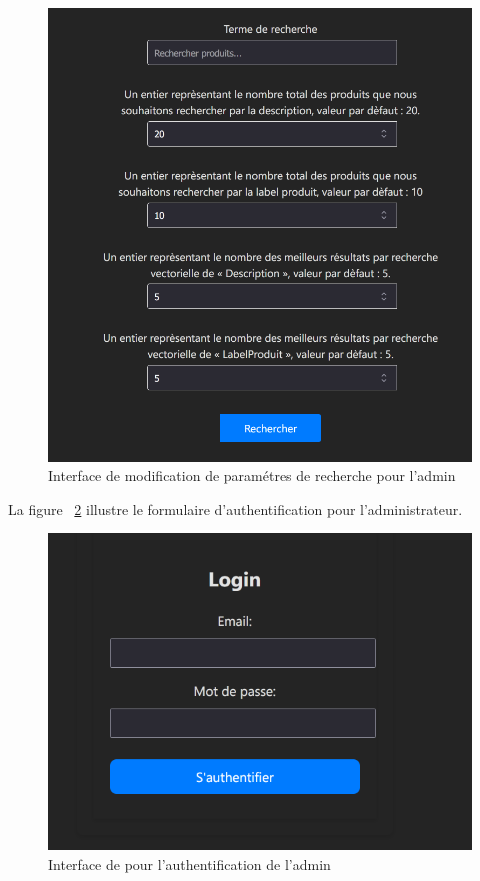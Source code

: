 \begin{figure}[H]
    \centering
    \includegraphics[width=1\textwidth]{logos/knnsearchform.png}
    \caption{Interface de modification de paramétres de recherche pour l'admin}
    \label{fig:knnsearchform}
\end{figure}

\newpage
\noindent
La figure ~\ref{fig:signin} illustre le formulaire d'authentification pour l'administrateur.

\begin{figure}[H]
    \centering
    \includegraphics[width=1\textwidth]{logos/login.png}
    \caption{Interface de pour l'authentification de l'admin}
    \label{fig:signin}
\end{figure}


